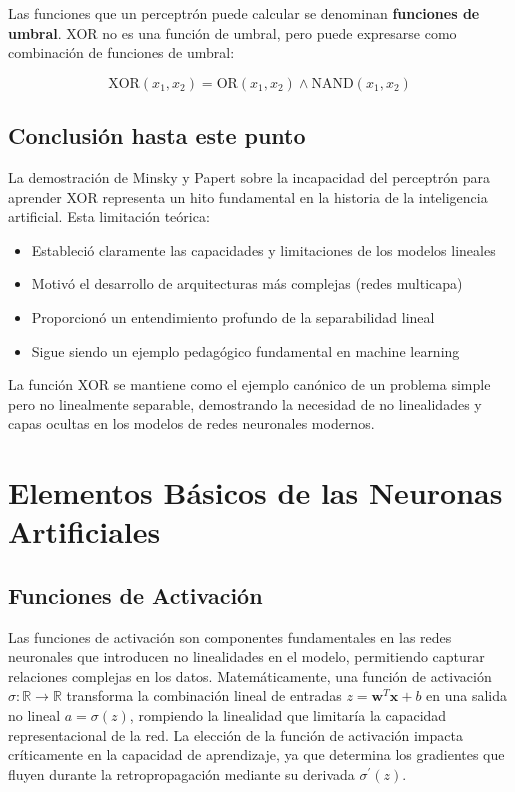 \documentclass[12pt]{article}
\begin{document}
Las funciones que un perceptrón puede calcular se denominan \textbf{funciones de umbral}. XOR no es una función de umbral, pero puede expresarse como combinación de funciones de umbral:

\begin{equation}
\text{XOR}(x_1,x_2) = \text{OR}(x_1,x_2) \land \text{NAND}(x_1,x_2)
\end{equation}

\subsection{Conclusión  hasta este punto}

La demostración de Minsky y Papert sobre la incapacidad del perceptrón para aprender XOR representa un hito fundamental en la historia de la inteligencia artificial. Esta limitación teórica:

\begin{itemize}
\item Estableció claramente las capacidades y limitaciones de los modelos lineales
\item Motivó el desarrollo de arquitecturas más complejas (redes multicapa)
\item Proporcionó un entendimiento profundo de la separabilidad lineal
\item Sigue siendo un ejemplo pedagógico fundamental en machine learning
\end{itemize}

La función XOR se mantiene como el ejemplo canónico de un problema simple pero no linealmente separable, demostrando la necesidad de no linealidades y capas ocultas en los modelos de redes neuronales modernos.

\section{Elementos Básicos de las Neuronas Artificiales}

\subsection{Funciones de Activación}

Las funciones de activación son componentes fundamentales en las redes neuronales que introducen no linealidades en el modelo, permitiendo capturar relaciones complejas en los datos. Matemáticamente, una función de activación $\sigma: \mathbb{R} \rightarrow \mathbb{R}$ transforma la combinación lineal de entradas $z=\mathbf{w}^T \mathbf{x}+b$ en una salida no lineal $a=\sigma(z)$, rompiendo la linealidad que limitaría la capacidad representacional de la red. La elección de la función de activación impacta críticamente en la capacidad de aprendizaje, ya que determina los gradientes que fluyen durante la retropropagación mediante su derivada $\sigma^{\prime}(z)$. 
\end{document}
